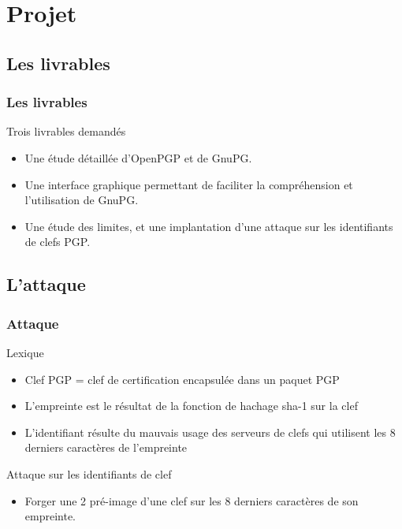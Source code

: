 \section{Projet}
\subsection{Les livrables}
\begin{frame}
    \frametitle{\color{white}Les livrables}
    \begin{block}{Trois livrables demandés}
      \begin{itemize}
         \item Une étude détaillée d'OpenPGP et de GnuPG.
         \item Une interface graphique permettant de faciliter la compréhension et l'utilisation de GnuPG.
         \item Une étude des limites, et une implantation d'une attaque sur les identifiants de clefs PGP.
       \end{itemize} 
    \end{block}
\end{frame}

\subsection{L'attaque}
\begin{frame}
  \frametitle{\color{white}Attaque}
  \begin{block}{Lexique}
    \begin{itemize}
      \item Clef PGP = clef de certification encapsulée dans un paquet PGP
      \item L'empreinte est le résultat de la fonction de hachage sha-1 sur la clef
      \item L'identifiant résulte du mauvais usage des serveurs de clefs qui utilisent les 8 derniers caractères de l'empreinte
    \end{itemize}
    \end{block}
  \begin{block}{Attaque sur les identifiants de clef}
    \begin{itemize}
      \item Forger une 2 pré-image d'une clef sur les 8 derniers caractères de son empreinte.
    \end{itemize}
  \end{block}
\end{frame}


